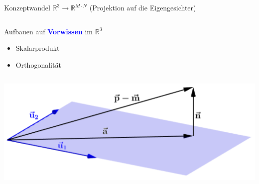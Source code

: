 \documentclass[10pt,aspectratio=169]{beamer}
\begin{document}
\begin{frame}[fragile]{Konzeptwandel $\mathbb R^3\longrightarrow\mathbb R^{M\cdot N}$ (Projektion auf die Eigengesichter)}
\begin{minipage}{0.45\textwidth}
\begin{columns}[T,onlytextwidth]
\begin{block}{Aufbauen auf \textcolor{blue}{\textbf{Vorwissen}} im $\mathbb R^3$}
\begin{itemize}
					\item Skalarprodukt
					\item Orthogonalität
				\end{itemize}
			\end{block}
		\end{columns}
	\end{minipage}\hfill
	\begin{minipage}{0.45\textwidth}
		\includegraphics[width=\textwidth]{images/projection2}
	\end{minipage}
\end{frame}
\end{document}
